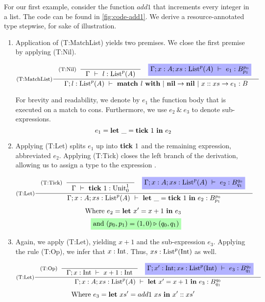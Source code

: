 \begin{example}
   For our first example, consider the function \(add1\) that increments every integer in a list. The code can be found in \cref{fig:code-add1}. We derive a resource-annotated type stepwise, for sake of illustration. 

   \begin{enumerate}[label=Step \Roman*:]
      \item Application of (T:MatchList) yields two premises. We close the first premise by applying (T:Nil). 

\[
   \inference[(T:MatchList)]
      {
         \inference[(T:Nil)]
         {
         }
         {
            \typing{\Gamma}{l}{\ralist{p}{A}}
         }
         \quad
         \typingHighlight{\typing{\Gamma;x:A;xs:\ralist{p}{A}}{e_1}{\ratype{B}{p_0}{p_1}}}
      }
      {
         \typing{\Gamma;l : \ralist{p}{A}}{\listmatch{l}{\listnil}{e_1}}{B}
      }
\]

For brevity and readability, we denote by \(e_1\) the function body that is executed on a match to cons. Furthermore, we use \(e_2 ~\&~ e_3\) to denote sub-expressions.
\[
   e_1 = \mathbf{let}~\_ = \mathbf{tick}~1~\mathbf{in}~e_2
\]

\item Applying (T:Let) splits \(e_1\) up into \(\mathbf{tick}~1\) and the remaining expression, abbreviated \(e_2\). Applying (T:Tick) closes the left branch of the derivation, allowing us to assign a type to the expression .

\[
   \inference[(T:Let)]
   {
      \inference[(T:Tick)]
      {
      }
      {
         \typing{\Gamma}{\tick{1}}{\ratype{\unit}{1}{0}}
      }
      \quad
      \typingHighlight{\typing{\Gamma;x:A;xs:\ralist{p}{A}}{e_2}{\ratype{B}{q_0}{q_1}}}
   }
   {
      \typing{\Gamma;x:A;xs:\ralist{p}{A}}{\letexp{\_}{\tick{1}}{e_2}}{\ratype{B}{p_0}{p_1}}
   }
\]
\begin{align}
   \text{Where } e_2 = \letexp{x'}{x + 1}{e_3} \nonumber \\
   \constraintHighlight{\text{and } (p_0, p_1) = (1, 0) \sequence (q_0, q_1)} \label{eqn:add1-first-seq}
\end{align}

   \item Again, we apply (T:Let), yielding \(x + 1\) and the sub-expression \(e_3\). Applying the rule (T:Op), we infer that \(x : \text{Int}\). Thus, \(xs : \text{List}^{p}(\text{Int})\) as well.

\[
   \inference[(T:Let)]
   {
      \inference[(T:Op)]
      {
      }
      {
         \typing{\Gamma;x:\typeint}{x + 1}{\typeint}
      }
      \quad
      \typingHighlight{\typing{\Gamma;x':\typeint;xs:\ralist{p}{\typeint}}{e_3}{\ratype{B}{q_0}{q_1}}}
   }
   {
      \typing{\Gamma;x:A;xs:\ralist{p}{A}}{\letexp{x'}{x + 1}{e_3}}{\ratype{B}{q_0}{q_1}}
   }
\]
\[
   \text{Where } e_3 = \mathbf{let}~xs' = add1~xs~\mathbf{in}~x' :: xs'
\]


\end{enumerate}
\end{example}
